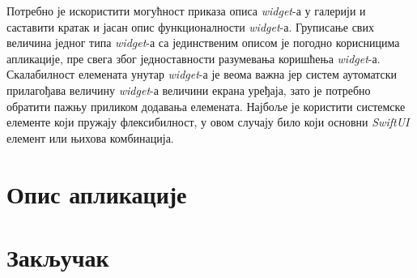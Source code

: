 \documentclass[12pt,oneside]{memoir}
\begin{document}
\indent Потребно је искористити могућност приказа описа \textit{widget}-а у галерији и саставити кратак и јасан опис функционалности \textit{widget}-а. Груписање свих величина једног типа \textit{widget}-а са јединственим описом је погодно корисницима апликације, пре свега због једноставности разумевања коришћења \textit{widget}-а.
\\
\indent Скалабилност елемената унутар \textit{widget}-а је веома важна јер систем аутоматски прилагођава величину \textit{widget}-а величини екрана уређаја, зато је потребно обратити пажњу приликом додавања елемената. Најбоље је користити системске елементе који пружају флексибилност, у овом случају било који основни \textit{SwiftUI} елемент или њихова комбинација.

\chapter{Опис апликације}

\chapter{Закључак}

\literatura
\end{document}
